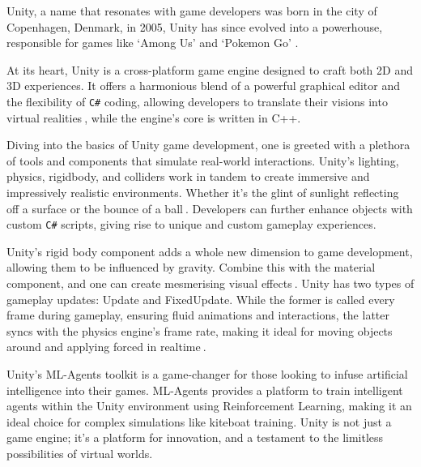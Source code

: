 Unity, a name that resonates with game developers was born in the city of Copenhagen, Denmark, in 2005, Unity has since evolved into a powerhouse, responsible for games like `Among Us' and `Pokemon Go' \cite{unity100seconds}.

At its heart, Unity is a cross-platform game engine designed to craft both 2D and 3D experiences. It offers a harmonious blend of a powerful graphical editor and the flexibility of \texttt{C\#} coding, allowing developers to translate their visions into virtual realities$~$\cite{unitymanual2021}, while the engine's core is written in C++.

Diving into the basics of Unity game development, one is greeted with a plethora of tools and components that simulate real-world interactions. Unity's lighting, physics, rigidbody, and colliders work in tandem to create immersive and impressively realistic environments. Whether it's the glint of sunlight reflecting off a surface or the bounce of a ball$~$\cite{goldstone2010}. Developers can further enhance objects with custom \texttt{C\#} scripts, giving rise to unique and custom gameplay experiences.


Unity's rigid body component adds a whole new dimension to game development, allowing them to be influenced by gravity. Combine this with the material component, and one can create mesmerising visual effects$~$\cite{blackman2012}. Unity has two types of gameplay updates: Update and FixedUpdate. While the former is called every frame during gameplay, ensuring fluid animations and interactions, the latter syncs with the physics engine's frame rate, making it ideal for moving objects around and applying forced in realtime$~$\cite{unityupdatefixedupdate}.

Unity's ML-Agents toolkit is a game-changer for those looking to infuse artificial intelligence into their games. ML-Agents provides a platform to train intelligent agents within the Unity environment using Reinforcement Learning, making it an ideal choice for complex simulations like kiteboat training. Unity is not just a game engine; it's a platform for innovation, and a testament to the limitless possibilities of virtual worlds.

